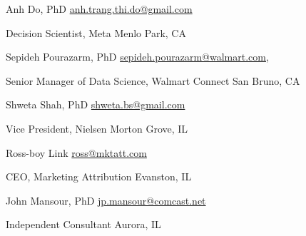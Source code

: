 

Anh Do, PhD \hfill \href{mailto:: anh.trang.thi.do@gmail.com}{anh.trang.thi.do@gmail.com} 

 Decision Scientist, Meta \hfill	 Menlo Park, CA

\vspace{0.5em}

Sepideh Pourazarm, PhD \hfill \href{sepideh.pourazarm@walmart.com,}{sepideh.pourazarm@walmart.com,} 

Senior Manager of Data Science, Walmart Connect \hfill	 San Bruno, CA

\vspace{0.5em}

Shweta Shah, PhD \hfill \href{mailto:ross@mktatt.com}{shweta.bs@gmail.com} 

Vice President, Nielsen \hfill	 Morton Grove, IL

\vspace{0.5em}

Ross-boy Link \hfill \href{mailto:ross@mktatt.com}{ross@mktatt.com} 

CEO, Marketing Attribution \hfill               Evanston, IL

\vspace{0.5em}

John Mansour, PhD \hfill \href{mailto:jp.mansour@comcast.net}{jp.mansour@comcast.net} 

Independent Consultant \hfill    Aurora, IL
